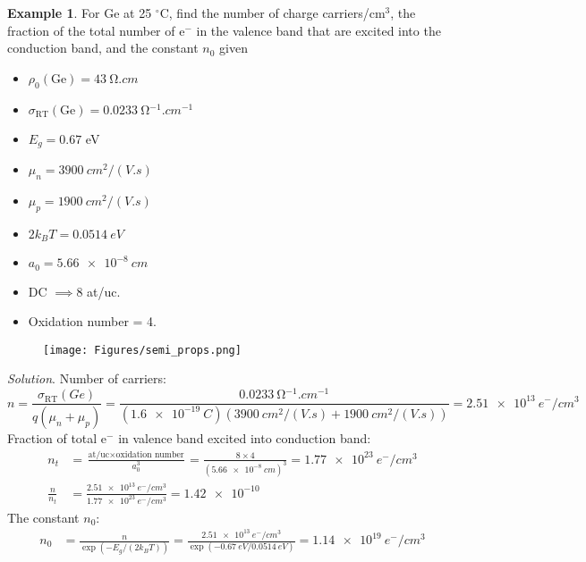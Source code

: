 \documentclass{article}
\theoremstyle{definition}
\newtheorem{example}[definition]{Example}
\begin{document}
\begin{example}
    For Ge at 25 $^\circ$C, find the number of charge carriers/cm$^3$, the fraction of the total number of e$^-$ in the valence band that are excited into the conduction band, and the constant $n_0$ given
    \begin{multicols}{3}
        \begin{itemize}
            \item $\rho_0(\text{Ge}) = \SI{43}{\ohm.cm}$
            \item $\sigma_{\text{RT}}(\text{Ge}) = \SI{0.0233}{\ohm^{-1}.cm^{-1}}$
            \item $E_g = 0.67$ eV
            \item $\mu_n = \SI{3900}{cm^2/(V.s)}$
            \item $\mu_p = \SI{1900}{cm^2/(V.s)}$
            \item $2k_BT = \SI{0.0514}{eV}$
            \item $a_0 = \SI{5.66e-8}{cm}$
            \item DC $\implies 8$ at/uc.
            \item Oxidation number = 4.
        \end{itemize}
    \end{multicols}

    \vspace{-1em}
    \begin{figure}[ht]
        \centering
        \texttt{[image: Figures/semi\_props.png]}
    \end{figure}

    \textit{Solution}. Number of carriers:
    \begin{equation*}
        n = \frac{\sigma_{\text{RT}}(Ge)}{q(\mu_n + \mu_p)} = \frac{\SI{0.0233}{\ohm^{-1}.cm^{-1}}}{(\SI{1.6e-19}{C})(\SI{3900}{cm^2/(V.s)} + \SI{1900}{cm^2/(V.s)})} = \SI{2.51e13}{e^-/cm^3}
    \end{equation*}
    Fraction of total e$^-$ in valence band excited into conduction band:
    \begin{align*}
        n_t &= \frac{\text{at/uc} \times \text{oxidation number}}{a_0^3} = \frac{8 \times 4}{(\SI{5.66e-8}{cm})^3} = \SI{1.77e23}{e^-/cm^3} \\
        \frac{n}{n_t} &= \frac{\SI{2.51e13}{e^-/cm^3}}{\SI{1.77e23}{e^-/cm^3}} = \SI{1.42e-10}{}
    \end{align*}
    The constant $n_0$:
    \begin{align*}
        n_0 &= \frac{n}{\exp(-E_g/(2k_B T))} = \frac{\SI{2.51e13}{e^-/cm^3}}{\exp(\SI{-0.67}{eV} / \SI{0.0514}{eV})} = \SI{1.14e19}{e^-/cm^3}
    \end{align*}
\end{example}
\end{document}
